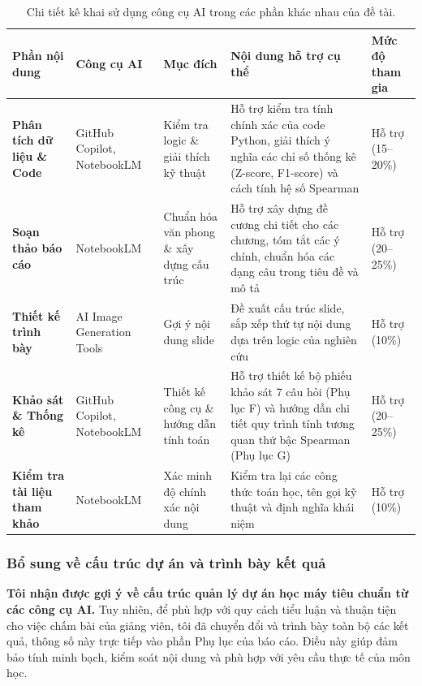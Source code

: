 \documentclass[14pt,a4paper]{extreport}
\begin{document}
\begin{table}[htbp]
  \centering
  \small
  \setlength{\tabcolsep}{5pt}
  \caption{Chi tiết kê khai sử dụng công cụ AI trong các phần khác nhau của đề tài.}
  \label{tab:ai-disclosure}
  \begin{tabular}{p{1.8cm}p{1.8cm}p{2.2cm}p{3.5cm}p{2.3cm}}
    \toprule
    \textbf{Phần nội dung} & \textbf{Công cụ AI} & \textbf{Mục đích} & \textbf{Nội dung hỗ trợ cụ thể} & \textbf{Mức độ tham gia} \\
    \midrule
    \textbf{Phân tích dữ liệu \& Code} & GitHub Copilot, NotebookLM & Kiểm tra logic \& giải thích kỹ thuật & Hỗ trợ kiểm tra tính chính xác của code Python, giải thích ý nghĩa các chỉ số thống kê (Z-score, F1-score) và cách tính hệ số Spearman & Hỗ trợ (15--20\%) \\
    \midrule
    \textbf{Soạn thảo báo cáo} & NotebookLM & Chuẩn hóa văn phong \& xây dựng cấu trúc & Hỗ trợ xây dựng đề cương chi tiết cho các chương, tóm tắt các ý chính, chuẩn hóa các dạng câu trong tiêu đề và mô tả & Hỗ trợ (20--25\%) \\
    \midrule
    \textbf{Thiết kế trình bày} & AI Image Generation Tools & Gợi ý nội dung slide & Đề xuất cấu trúc slide, sắp xếp thứ tự nội dung dựa trên logic của nghiên cứu & Hỗ trợ (10\%) \\
    \midrule
    \textbf{Khảo sát \& Thống kê} & GitHub Copilot, NotebookLM & Thiết kế công cụ \& hướng dẫn tính toán & Hỗ trợ thiết kế bộ phiếu khảo sát 7 câu hỏi (Phụ lục F) và hướng dẫn chi tiết quy trình tính tương quan thứ bậc Spearman (Phụ lục G) & Hỗ trợ (20--25\%) \\
    \midrule
    \textbf{Kiểm tra tài liệu tham khảo} & NotebookLM & Xác minh độ chính xác nội dung & Kiểm tra lại các công thức toán học, tên gọi kỹ thuật và định nghĩa khái niệm & Hỗ trợ (10\%) \\
    \bottomrule
  \end{tabular}
\end{table}

\subsubsection*{Bổ sung về cấu trúc dự án và trình bày kết quả}

\textbf{Tôi nhận được gợi ý về cấu trúc quản lý dự án học máy tiêu chuẩn từ các công cụ AI.} Tuy nhiên, để phù hợp với quy cách tiểu luận và thuận tiện cho việc chấm bài của giảng viên, tôi đã chuyển đổi và trình bày toàn bộ các kết quả, thông số này trực tiếp vào phần Phụ lục của báo cáo. Điều này giúp đảm bảo tính minh bạch, kiểm soát nội dung và phù hợp với yêu cầu thực tế của môn học.
\end{document}
